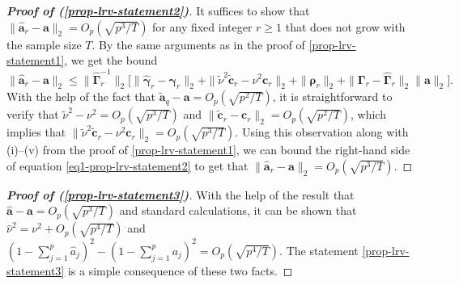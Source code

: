 \begin{proof}[\textnormal{\textbf{Proof of (\ref{prop-lrv-statement2})}}] 
It suffices to show that $\| \widehat{\boldsymbol{a}}_r - \boldsymbol{a} \|_2 = O_p(\sqrt{p^3/T})$ for any fixed integer $r \ge 1$ that does not grow with the sample size $T$. By the same arguments as in the proof of \eqref{prop-lrv-statement1}, we get the bound
\begin{equation}\label{eq1-prop-lrv-statement2}
\| \widehat{\boldsymbol{a}}_r - \boldsymbol{a} \|_2 \le \| \widehat{\boldsymbol{\Gamma}}_r^{-1} \|_2 \Big[ \| \widehat{\boldsymbol{\gamma}}_r - \boldsymbol{\gamma}_r \|_2 + \| \widetilde{\nu}^2 \widetilde{\boldsymbol{c}}_r - \nu^2 \boldsymbol{c}_r \|_2 + \| \boldsymbol{\rho}_r \|_2 + \| \boldsymbol{\Gamma}_r - \widehat{\boldsymbol{\Gamma}}_r \|_2 \| \boldsymbol{a} \|_2 \Big]. 
\end{equation}
With the help of the fact that $\widetilde{\boldsymbol{a}}_q - \boldsymbol{a} = O_p(\sqrt{p^2/T})$, it is straightforward to verify that $\widetilde{\nu}^2 - \nu^2 = O_p(\sqrt{p^3/T})$ and $\| \widetilde{\boldsymbol{c}}_r - \boldsymbol{c}_r \|_2 = O_p(\sqrt{p^2/T})$, which implies that $\| \widetilde{\nu}^2 \widetilde{\boldsymbol{c}}_r - \nu^2 \boldsymbol{c}_r \|_2 = O_p(\sqrt{p^3/T})$. Using this observation along with (i)--(v) from the proof of \eqref{prop-lrv-statement1}, we can bound the right-hand side of equation \eqref{eq1-prop-lrv-statement2} to get that $\| \widehat{\boldsymbol{a}}_r - \boldsymbol{a} \|_2 = O_p(\sqrt{p^3/T})$. 
\end{proof}


\begin{proof}[\textnormal{\textbf{Proof of (\ref{prop-lrv-statement3})}}] 
With the help of the result that $\widehat{\boldsymbol{a}} - \boldsymbol{a} = O_p(\sqrt{p^3/T})$ and standard calculations, it can be shown that $\widehat{\nu}^2 = \nu^2 + O_p(\sqrt{p^4/T})$ and $(1 - \sum_{j=1}^p \widehat{a}_j)^2 - (1 - \sum_{j=1}^p a_j)^2 = O_p(\sqrt{p^4/T})$. The statement \eqref{prop-lrv-statement3} is a simple consequence of these two facts.  
\end{proof}




